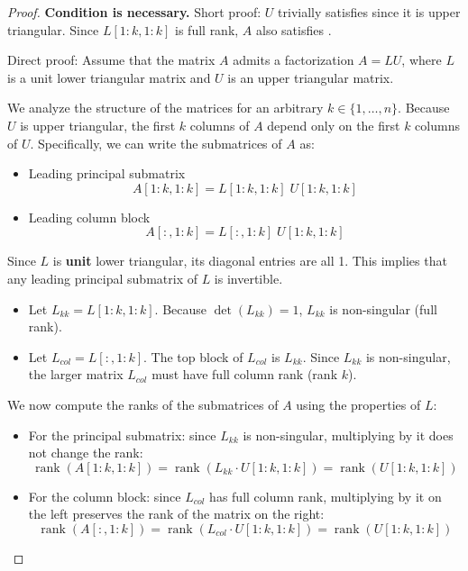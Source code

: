 \documentclass[10pt,twoside]{siamart1116}
\DeclareMathOperator{\rk}{rank}
\numberwithin{theorem}{section}
\begin{document}
\begin{proof} \par
	\textbf{Condition is necessary.} \quad Short proof: $U$ trivially satisfies  since it is upper triangular. Since $L[1:k,1:k]$ is full rank, $A$ also satisfies .

	Direct proof: Assume that the matrix $A$ admits a factorization $A = LU$, where $L$ is a unit lower triangular matrix and $U$ is an upper triangular matrix.

	We analyze the structure of the matrices for an arbitrary $k \in \{1, \dots, n\}$.
	Because $U$ is upper triangular, the first $k$ columns of $A$ depend only on the first $k$ columns of $U$. Specifically, we can write the submatrices of $A$ as:

	\begin{itemize}
		\item Leading principal submatrix
		\[ A[1:k, 1:k] = L[1:k, 1:k] \; U[1:k, 1:k] \]
		\item Leading column block
		\[ A[:, 1:k] = L[:, 1:k] \; U[1:k, 1:k] \]
	\end{itemize}

	Since $L$ is \textbf{unit} lower triangular, its diagonal entries are all 1. This implies that any leading principal submatrix of $L$ is invertible.
	\begin{itemize}
		\item Let $L_{kk} = L[1:k, 1:k]$. Because $\det(L_{kk}) = 1$, $L_{kk}$ is non-singular (full rank).
		\item Let $L_{col} = L[:, 1:k]$. The top block of $L_{col}$ is $L_{kk}$. Since $L_{kk}$ is non-singular, the larger matrix $L_{col}$ must have full column rank (rank $k$).
	\end{itemize}

	We now compute the ranks of the submatrices of $A$ using the properties of $L$:
	\begin{itemize}
		\item For the principal submatrix: since $L_{kk}$ is non-singular, multiplying by it does not change the rank:
		\[ \rk(A[1:k, 1:k]) = \rk(L_{kk} \cdot U[1:k, 1:k]) = \rk(U[1:k, 1:k]) \]
		\item For the column block: since $L_{col}$ has full column rank, multiplying by it on the left preserves the rank of the matrix on the right:
		\[ \rk(A[:, 1:k]) = \rk(L_{col} \cdot U[1:k, 1:k]) = \rk(U[1:k, 1:k]) \]
	\end{itemize}


\end{proof}
\end{document}
